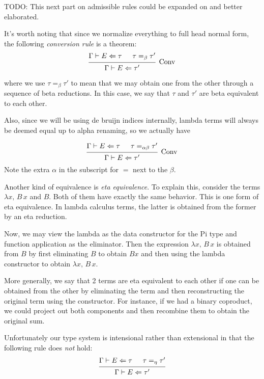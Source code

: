 \documentclass{article}
\begin{document}
TODO: This next part on admissible rules could be expanded on and better
elaborated.

It's worth noting that since we normalize everything to full head normal form,
the following \textit{conversion rule} is a theorem:
\begin{align*}
  \begin{prooftree}
    \hypo{\Gamma \vdash E \Leftarrow \tau}
    \hypo{\tau =_\beta \tau'}
    \infer2[\text{Conv}]{\Gamma \vdash E \Leftarrow \tau'}
  \end{prooftree}
\end{align*}

where we use $\tau =_\beta \tau'$ to mean that we may obtain one from the other
through a sequence of beta reductions. In this case, we say that $\tau$ and
$\tau'$ are beta equivalent to each other.

Also, since we will be using de bruijn indices internally, lambda terms will
always be deemed equal up to alpha renaming, so we actually have

\begin{align*}
  \begin{prooftree}
    \hypo{\Gamma \vdash E \Leftarrow \tau}
    \hypo{\tau =_{\alpha \beta} \tau'}
    \infer2[\text{Conv}]{\Gamma \vdash E \Leftarrow \tau'}
  \end{prooftree}
\end{align*}
Note the extra $\alpha$ in the subscript for $=$ next to the $\beta$.

Another kind of equivalence is \textit{eta equivalence}. To explain this,
consider the terms $\lambda x, \, B \, x$ and $B$. Both of them have exactly the
same behavior. This is one form of eta equivalence.
In lambda calculus terms, the latter is obtained from the former by an eta
reduction.

Now, we may view the lambda as the data constructor for
the Pi type and function application as the eliminator.
Then the expression $\lambda x, \, B \, x$ is obtained from $B$ by first
eliminating $B$ to obtain $B x$ and then using the lambda
constructor to obtain $\lambda x, \, B \, x$.

More generally, we say that 2 terms are eta equivalent to each other if one can
be obtained from the other by eliminating the term and then reconstructing the
original term using the constructor. For instance, if we had a binary coproduct,
we could project out both components and then recombine them to obtain the
original sum.

Unfortunately our type system is intensional rather than extensional in
that the following rule does \textit{not} hold: 
\[
  \begin{prooftree}
    \hypo{\Gamma \vdash E \Leftarrow \tau}
    \hypo{\tau =_\eta \tau'}
    \infer2{\Gamma \vdash E \Leftarrow \tau'}
  \end{prooftree}
\]
\end{document}
